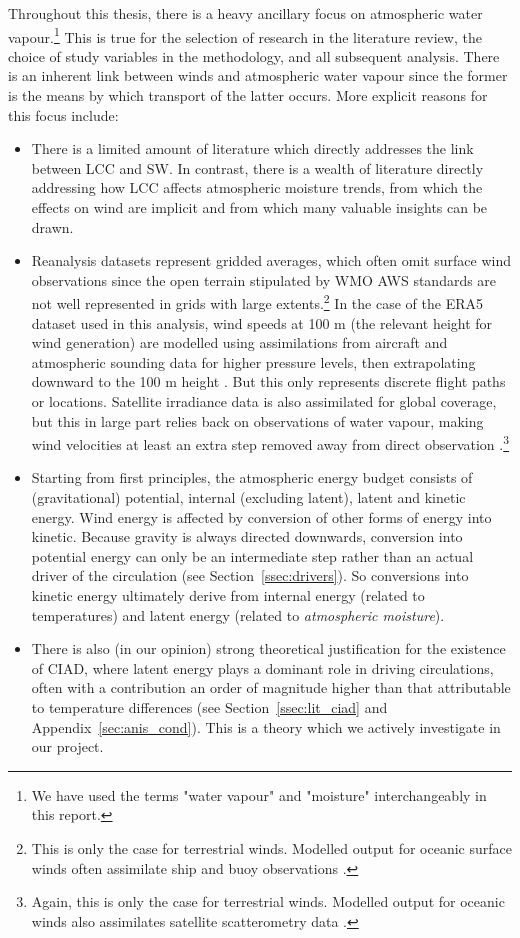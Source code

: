 Throughout this thesis, there is a heavy ancillary focus on atmospheric water vapour.\footnote{We have used the terms "water vapour" and "moisture" interchangeably in this report.} This is true for the selection of research in the literature review, the choice of study variables in the methodology, and all subsequent analysis. There is an inherent link between winds and atmospheric water vapour since the former is the means by which transport of the latter occurs. More explicit reasons for this focus include:

\begin{itemize}
	\item There is a limited amount of literature which directly addresses the link between \ac{LCC} and \ac{SW}. In contrast, there is a wealth of literature directly addressing how \ac{LCC} affects atmospheric moisture trends, from which the effects on wind are implicit and from which many valuable insights can be drawn.
	\item Reanalysis datasets represent gridded averages, which often omit surface wind observations since the open terrain stipulated by \ac{WMO} \ac{AWS} standards are not well represented in grids with large extents.\footnote{This is only the case for terrestrial winds. Modelled output for oceanic surface winds often assimilate ship and buoy observations \citep{ecmwf2016}.} In the case of the \ac{ERA5} dataset used in this analysis, wind speeds at 100 m (the relevant height for wind generation) are modelled using assimilations from aircraft and atmospheric sounding data for higher pressure levels, then extrapolating downward to the 100 m height \citep{ecmwf2016}. But this only represents discrete flight paths or locations. Satellite irradiance data is also assimilated for global coverage, but this in large part relies back on observations of water vapour, making wind velocities at least an extra step removed away from direct observation \citep{ecmwf2016}.\footnote{Again, this is only the case for terrestrial winds. Modelled output for oceanic winds also assimilates satellite scatterometry data \citep{ecmwf2016}.}
	\item Starting from first principles, the atmospheric energy budget consists of (gravitational) potential, internal (excluding latent), latent and kinetic energy. Wind energy is affected by conversion of other forms of energy into kinetic. Because gravity is always directed downwards, conversion into potential energy can only be an intermediate step rather than an actual driver of the circulation (see Section~\ref{ssec:drivers}). So conversions into kinetic energy ultimately derive from internal energy (related to temperatures) and latent energy (related to \textit{atmospheric moisture}).
	\item There is also (in our opinion) strong theoretical justification for the existence of \ac{CIAD}, where latent energy plays a dominant role in driving circulations, often with a contribution an order of magnitude higher than that attributable to temperature differences (see Section~\ref{ssec:lit_ciad} and Appendix~\ref{sec:anis_cond}). This is a theory which we actively investigate in our project.
\end{itemize}

